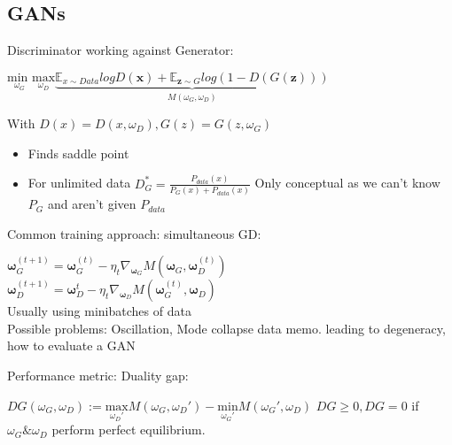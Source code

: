 \subsection{GANs}

Discriminator working against Generator:
\begin{center}
    $\underset{\omega_G}{\text{min }}\underset{\omega_D}{\text{max}}\underbrace{\mathbb{E}_{x\sim Data}logD(\boldsymbol{x}) + \mathbb{E}_{\boldsymbol{z}\sim G}log(1-D(G(\boldsymbol{z})))}_{M(\omega_G,\omega_D)}$
\end{center}
With $D(x) = D(x,\omega_D), G(z) = G(z,\omega_G)$

\begin{itemize}
    \item Finds saddle point
    \item For unlimited data $D^*_G = \frac{P_{data}(x)}{P_G(x) + P_{data}(x)}$
    Only conceptual as we can't know $P_G$ and aren't given $P_{data}$
\end{itemize}

Common training approach: simultaneous GD:
\begin{center}
    $\boldsymbol{\omega}_G^{(t+1)} = \boldsymbol{\omega}_G^{(t)} - \eta_t\nabla_{\boldsymbol{\omega}_G}M(\boldsymbol{\omega}_G,\boldsymbol{\omega}_D^{(t)})$\\
    $\boldsymbol{\omega}_D^{(t+1)} = \boldsymbol{\omega}_D^t - \eta_t\nabla_{\boldsymbol{\omega}_D}M(\boldsymbol{\omega}_G^{(t)},\boldsymbol{\omega}_D)$\\
    Usually using minibatches of data\\
    Possible problems: Oscillation, Mode collapse%
    data memo. leading to degeneracy, how to evaluate a GAN
\end{center}
Performance metric: Duality gap:
\begin{center}
    $DG(\omega_G,\omega_D) := \underset{\omega_D'}{\text{max}}M(\omega_G,\omega_D') - \underset{\omega_G'}{\text{min}}M(\omega_G',\omega_D)$
    $DG \geq 0, DG = 0$ if $\omega_G \& \omega_D$ perform perfect equilibrium.\\
\end{center}